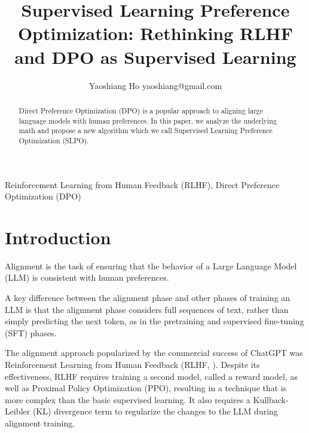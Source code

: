 \documentclass[twoside,11pt]{article}
\begin{document}
\title{Supervised Learning Preference Optimization: Rethinking RLHF and DPO as Supervised Learning}

\author{\name Yaoshiang Ho \email yaoshiang@gmail.com \\
      }

\editor{}

\maketitle 

\begin{abstract}%
Direct Preference Optimization (DPO) is a popular approach to aligning 
large language models with human preferences. 
In this paper, we analyze the underlying math and 
propose a new algorithm
which we call Supervised Learning Preference Optimization (SLPO). 
 
\end{abstract}

\begin{keywords}
  Reinforcement Learning from Human Feedback (RLHF), Direct Preference Optimization (DPO)
\end{keywords}

\section{Introduction}

Alignment is the task of ensuring that the behavior of a
Large Language Model (LLM) is consistent 
with human preferences. 

A key difference between the alignment phase and
other phases of training an LLM is that the alignment phase considers
full sequences of text, rather than simply predicting the next token, as
in the pretraining and supervised fine-tuning (SFT) phases. 

The alignment approach popularized by the commercial success of ChatGPT was 
Reinforcement Learning from Human Feedback (RLHF, \cite{ouyang2022training}). 
Despite its effectiveness, RLHF requires training a second model, called
a reward model, as well as Proximal Policy Optimization (PPO), resulting in a 
technique that is more complex than the basic supervised learning. It also
requires a Kullback-Leibler (KL) divergence term to regularize the
changes to the LLM during alignment training.
\end{document}

